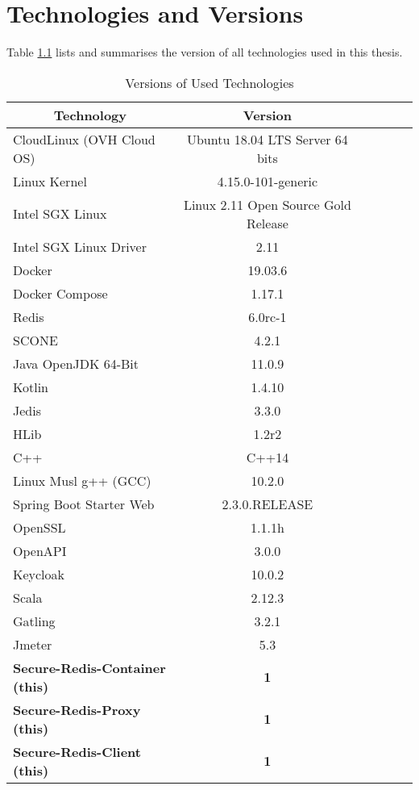 \chapter{Technologies and Versions}
\label{ann:technologies_and_versions}

Table \ref{tab:versions_of_used_technologies} lists and summarises the version of all technologies used in this thesis.

\begin{table}[ht]
	\caption{Versions of Used Technologies}
	\label{tab:versions_of_used_technologies}
\centering
\begin{tabular}{lccccc}
	\toprule
	\multicolumn{1}{c}{\textbf{Technology}} 	& \multicolumn{1}{c}{\textbf{Version}} \\
	\midrule
		CloudLinux (OVH Cloud OS) 			& 		Ubuntu 18.04 LTS Server 64 bits 	\\
		Linux Kernel						&		4.15.0-101-generic					\\
		Intel SGX Linux						&		Linux 2.11 Open Source Gold Release \\
		Intel SGX Linux	Driver				&		2.11 								\\
		Docker								& 		19.03.6 								\\
		Docker Compose						& 		1.17.1 								\\
		Redis								& 		6.0rc-1 								\\
		SCONE 								& 		4.2.1 								\\
		Java OpenJDK 64-Bit 					& 		11.0.9								\\
		Kotlin 								& 		1.4.10								\\
		Jedis								&		3.3.0								\\
		HLib								&		1.2r2								\\
		C++									& 		C++14								\\
		Linux Musl g++ (GCC)					& 		10.2.0								\\
		Spring Boot Starter	Web				& 		2.3.0.RELEASE						\\
		OpenSSL								&		1.1.1h								\\
		OpenAPI								&		3.0.0								\\
		Keycloak							& 		10.0.2								\\
		Scala								& 		2.12.3								\\
		Gatling								& 		3.2.1								\\
		Jmeter								&		5.3									\\
	\midrule
	\textbf{Secure-Redis-Container (this)}	&		\textbf{1}							\\
	\textbf{Secure-Redis-Proxy (this)}		&		\textbf{1}							\\
	\textbf{Secure-Redis-Client	(this)}		&		\textbf{1}							\\
	\bottomrule
\end{tabular}
\end{table}
